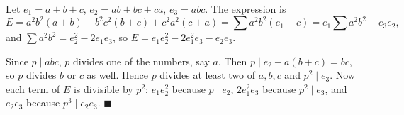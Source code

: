 Let $e_1=a+b+c$, $e_2=ab+bc+ca$, $e_3=abc$. The expression is
\[E=a^2b^2(a+b)+b^2c^2(b+c)+c^2a^2(c+a)=\sum a^2b^2(e_1-c)=e_1\sum a^2b^2-e_3e_2,\]
and $\sum a^2b^2=e_2^2-2e_1e_3$, so $E=e_1e_2^2-2e_1^2e_3-e_2e_3$.

Since $p\mid abc$, $p$ divides one of the numbers, say $a$. Then $p\mid e_2-a(b+c)=bc$, so $p$ divides $b$ or $c$ as well. Hence $p$ divides at least two of $a,b,c$ and $p^2\mid e_3$. Now each term of $E$ is divisible by $p^2$: $e_1e_2^2$ because $p\mid e_2$, $2e_1^2e_3$ because $p^2\mid e_3$, and $e_2e_3$ because $p^3\mid e_2e_3$. $\blacksquare$
